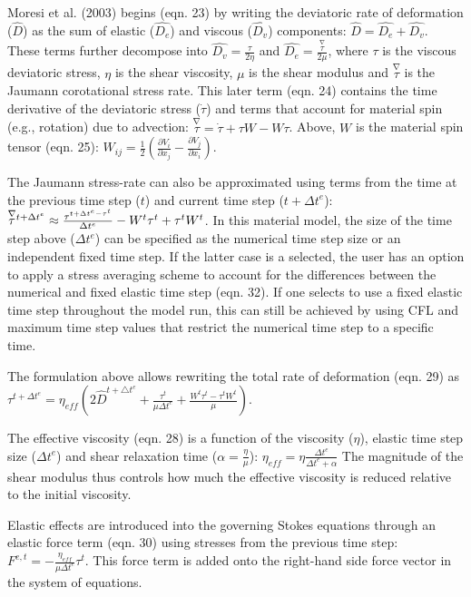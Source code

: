 \begin{itemize}
 Moresi et al. (2003) begins (eqn. 23) by writing the deviatoric rate of deformation ($\hat{D}$) as the sum of elastic ($\hat{D_{e}}$) and viscous ($\hat{D_{v}}$) components: $\hat{D} = \hat{D_{e}} + \hat{D_{v}}$.  These terms further decompose into $\hat{D_{v}} = \frac{\tau}{2\eta}$ and $\hat{D_{e}} = \frac{\overset{\nabla}{\tau}}{2\mu}$, where $\tau$ is the viscous deviatoric stress, $\eta$ is the shear viscosity, $\mu$ is the shear modulus and $\overset{\nabla}{\tau}$ is the Jaumann corotational stress rate. This later term (eqn. 24) contains the time derivative of the deviatoric stress ($\dot{\tau}$) and terms that account for material spin (e.g., rotation) due to advection: $\overset{\nabla}{\tau} = \dot{\tau} + {\tau}W -W\tau$. Above, $W$ is the material spin tensor (eqn. 25): $W_{ij} = \frac{1}{2} \left (\frac{\partial V_{i}}{\partial x_{j}} - \frac{\partial V_{j}}{\partial x_{i}} \right )$. 

 The Jaumann stress-rate can also be approximated using terms from the time at the previous time step ($t$) and current time step ($t + \Delta t^{e}$): $\smash[t]{\overset{\nabla}{\tau}}^{t + \Delta t^{e}} \approx \frac{\tau^{t + \Delta t^{e} - \tau^{t}}}{\Delta t^{e}} - W^{t}\tau^{t} + \tau^{t}W^{t}$. In this material model, the size of the time step above ($\Delta t^{e}$) can be specified as the numerical time step size or an independent fixed time step. If the latter case is a selected, the user has an option to apply a stress averaging scheme to account for the differences between the numerical and fixed elastic time step (eqn. 32). If one selects to use a fixed elastic time step throughout the model run, this can still be achieved by using CFL and maximum time step values that restrict the numerical time step to a specific time.

 The formulation above allows rewriting the total rate of deformation (eqn. 29) as $\tau^{t + \Delta t^{e}} = \eta_{eff} \left ( 2\hat{D}^{t + \triangle t^{e}} + \frac{\tau^{t}}{\mu \Delta t^{e}} + \frac{W^{t}\tau^{t} - \tau^{t}W^{t}}{\mu}  \right )$. 

 The effective viscosity (eqn. 28) is a function of the viscosity ($\eta$), elastic time step size ($\Delta t^{e}$) and shear relaxation time ($ \alpha = \frac{\eta}{\mu} $): $\eta_{eff} = \eta \frac{\Delta t^{e}}{\Delta t^{e} + \alpha}$ The magnitude of the shear modulus thus controls how much the effective viscosity is reduced relative to the initial viscosity. 

 Elastic effects are introduced into the governing Stokes equations through an elastic force term (eqn. 30) using stresses from the previous time step: $F^{e,t} = -\frac{\eta_{eff}}{\mu \Delta t^{e}} \tau^{t}$. This force term is added onto the right-hand side force vector in the system of equations. 


\end{itemize}
